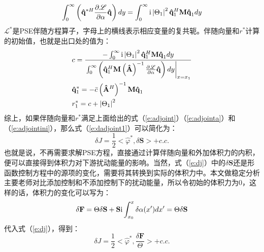 \begin{equation}
\label{e:adjointa}
\int_0^\infty  {\left( {\mathbf{\hat q} ^{*H} \frac{{\partial {\mathscr{L}}}}
{{\partial \alpha }}\mathbf{\hat q} } \right)dy}  = \int_0^\infty  {{\rm i}\left| {\Theta _1 } \right|^2 \mathbf{\hat q} _1 ^H \mathbf{M\hat q} _1 dy}
\end{equation}
$\mathscr{L}^*$是PSE伴随方程算子，字母上的横线表示相应变量的复共轭。伴随向量和$r^*$计算的初始值，也就是出口处的值为：
\begin{equation}
\label{e:adjointini}
\begin{gathered}
c = \frac{{ - \int_0^\infty  {{\rm i}\left| {\Theta _1 } \right|^2 {\mathbf{\hat q}}_1 ^H {\mathbf{M\hat q}}_1 dy} }}
{{\left. {\int_0^\infty  {\left( {{\mathbf{\hat q}}_1 ^H {\mathbf{M}}\left( {{\mathbf{\hat A}}} \right)^{ - 1} \frac{{\partial {\mathscr{L}}}}{{\partial \alpha }}{\mathbf{\hat q}}} \right)dy} } \right|_{x = x_1 } }} \hfill \\
{\mathbf{\hat q}}^* _1  =  - \bar c\left( {{\mathbf{\hat A}}^H } \right)^{ - 1} {\mathbf{M\hat q}}_1  \hfill \\
r_1^*  = c + \left| {\Theta _1 } \right|^2  \hfill \\
\end{gathered}
\end{equation}
综上，如果伴随向量和$r^*$满足上面给出的式（\ref{e:adjoint}）（\ref{e:adjointa}）和（\ref{e:adjointini}），那么式（\ref{e:dadjoint1}）可以简化为：
\begin{equation}
\label{e:dj}
\delta J = \frac{1}
{2} < \hat \varphi ^* ,\delta {\mathbf{S}} >  + c.c.
\end{equation}
也就是说，不再需要求解PSE方程，直接通过计算伴随向量和外加体积力的内积，便可以直接得到体积力对下游扰动能量的影响。当然，式（\ref{e:dj}）中的$\delta {\mathbf{S}}$还是形函数控制方程中的源项的变化，需要将其转换到实际的体积力中。本文做稳定分析主要老师对比添加控制和不添加控制下的扰动能量，所以令初始的体积力为0，这样的话，体积力的变化可以写为：
\begin{equation}
\label{e:df}
\delta {\mathbf{F}} = \Theta \delta {\mathbf{S}} + {\mathbf{S}}{\rm i}\int_{x_0 }^x {\delta \alpha (x')dx'}  = \Theta \delta {\mathbf{S}}
\end{equation}
代入式（\ref{e:dj}），得到：
\begin{equation}
\label{e:dj2}
\delta J = \frac{1}
{2} < \hat \varphi ^* ,\frac{{\delta {\mathbf{F}}}}
{\Theta } >  + c.c.
\end{equation}
